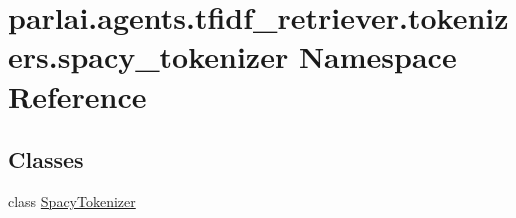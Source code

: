 \hypertarget{namespaceparlai_1_1agents_1_1tfidf__retriever_1_1tokenizers_1_1spacy__tokenizer}{}\section{parlai.\+agents.\+tfidf\+\_\+retriever.\+tokenizers.\+spacy\+\_\+tokenizer Namespace Reference}
\label{namespaceparlai_1_1agents_1_1tfidf__retriever_1_1tokenizers_1_1spacy__tokenizer}
\subsection*{Classes}
\begin{DoxyCompactItemize}
\item 
class \hyperlink{classparlai_1_1agents_1_1tfidf__retriever_1_1tokenizers_1_1spacy__tokenizer_1_1SpacyTokenizer}{Spacy\+Tokenizer}
\end{DoxyCompactItemize}
